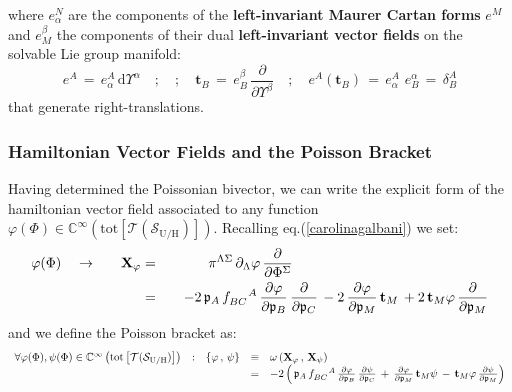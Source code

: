\documentclass[10pt,a4paper]{article}
\begin{document}
where $e^N_\alpha$ are the components of the \textbf{left-invariant Maurer Cartan forms} $e^M$ and $e_M^\beta$ the components of their dual \textbf{left-invariant vector fields} on the solvable Lie group manifold:
\begin{equation}\label{porcellino}
  e^A \, = \, e^A_\alpha \, \mathrm{d}\Upsilon^\alpha \quad ; \quad ; \quad \mathbf{t}_B \, = \,e_B^\beta \, \frac{\partial}{\partial \Upsilon^\beta}  \quad ;
  \quad e^A(\mathbf{t}_B) \, = \, e^A_\alpha \, \,e_B^\alpha \, = \, \delta^A_B
\end{equation}
that generate right-translations.
\subsubsection{Hamiltonian Vector Fields and the Poisson Bracket}
Having determined the Poissonian bivector, we can write the explicit form of the hamiltonian vector field associated to any
function $\varphi(\Phi) \in \mathbb{C}^\infty\left (\mathrm{tot}\left[\mathcal{T}(\mathcal{S}_\mathrm{U/H})\right] \right)$. Recalling eq.(\ref{carolinagalbani}) we set:
\begin{alignat}{5}\label{hamilfreccia}
  \varphi(\Phi) & \quad \rightarrow \quad & \mathbf{X}_\varphi & = & \quad\pi^{\Lambda\Sigma}\, \partial_\Lambda\varphi \, \frac{\partial}{\partial \Phi^\Sigma} \quad\quad\quad\quad\quad\quad\quad\quad\quad\quad\quad\quad\quad\quad & \null \nonumber\\
   \null & \null & \null & = & \quad - 2 \, \mathfrak{p}_A \, f^{\phantom{BC}A}_{BC} \, \frac{\partial \varphi}{\partial \mathfrak{p}_B} \, \frac{\partial }{\partial \mathfrak{p}_C}\,- 2 \, \frac{\partial \varphi}{\partial \mathfrak{p}_M} \, \mathbf{t}_M \, + 2 \, \mathbf{t}_M\varphi \, \frac{\partial }{\partial \mathfrak{p}_M} & \null
\end{alignat}
and we define the Poisson bracket as:
\begin{equation}\label{corbellus}
\begin{array}{rcccl}
  \forall \varphi(\Phi),\psi(\Phi) \in \mathbb{C}^\infty\left (\mathrm{tot}\left[\mathcal{T}(\mathcal{S}_\mathrm{U/H})\right] \right) & : & \left\{\varphi\, , \, \psi\right\} & \equiv & \omega\left(\mathbf{X}_\varphi \, ,\,\mathbf{X}_\psi \right) \\
  \null & \null & \null & = & -2 \left( \, \mathfrak{p}_A \,f^{\phantom{BC}A}_{BC} \, \frac{\partial \varphi}{\partial \mathfrak{p}_B} \, \frac{\partial \psi }{\partial \mathfrak{p}_C}\,+\, \frac{\partial \varphi}{\partial  \mathfrak{p}_M} \, \mathbf{t}_M \psi \, - \, \mathbf{t}_M\varphi \, \frac{\partial \psi}{\partial \mathfrak{p}_M} \right) \\
  \end{array}
\end{equation}
\end{document}
